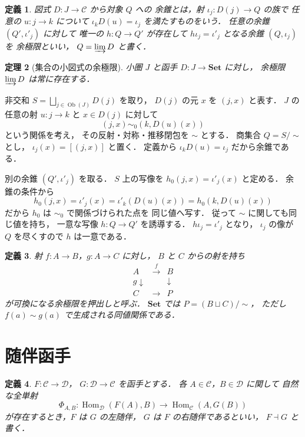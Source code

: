 \documentclass[a5paper,10pt,onecolumn]{jsarticle}
\makeatletter
\theoremstyle{mathnotetheorem}
\newtheorem{theorem}{定理}[section]
\newtheorem{definition}[theorem]{定義}
\renewcommand{\proofname}{証明}
\renewenvironment{proof}[1][\proofname]{%
  \par\pushQED{\qed}\normalfont\topsep4\p@\@plus2\p@\relax
  \trivlist\item[\hskip\labelsep\bfseries #1]\ignorespaces
}{\popQED\endtrivlist\@endpefalse}
\makeatother
\begin{document}
\begin{definition}
図式 $D:J\to\mathcal C$ から対象 $Q$ への
\emph{余錐}とは，射 $\iota_j:D(j)\to Q$ の族で
任意の $u:j\to k$ について
$\iota_kD(u)=\iota_j$ を満たすものをいう．
任意の余錐 $(Q',\iota'_j)$ に対して
唯一の $h:Q\to Q'$ が存在して
$h\iota_j=\iota'_j$ となる余錐 $(Q,\iota_j)$ を
\emph{余極限}といい，
$Q=\varinjlim D$ と書く．
\end{definition}

\begin{theorem}[集合の小図式の余極限]\label{thm:set-colimits}
小圏 $J$ と函手 $D:J\to\mathbf{Set}$ に対し，
余極限 $\varinjlim D$ は常に存在する．
\end{theorem}
\begin{proof}
非交和
$S=\bigsqcup_{j\in\operatorname{Ob}(J)}D(j)$ を取り，
$D(j)$ の元 $x$ を $(j,x)$ と表す．
$J$ の任意の射 $u:j\to k$ と $x\in D(j)$ に対して
\[
 (j,x)\sim_0(k,D(u)(x))
\]
という関係を考え，
その反射・対称・推移閉包を $\sim$ とする．
商集合 $Q=S/{\sim}$ とし，
$\iota_j(x)=[(j,x)]$ と置く．
定義から $\iota_kD(u)=\iota_j$ だから余錐である．

別の余錐 $(Q',\iota'_j)$ を取る．
$S$ 上の写像を $h_0(j,x)=\iota'_j(x)$ と定める．
余錐の条件から
\[
 h_0(j,x)=\iota'_j(x)
 =\iota'_k(D(u)(x))
 =h_0(k,D(u)(x))
\]
だから $h_0$ は $\sim_0$ で関係づけられた点を
同じ値へ写す．
従って $\sim$ に関しても同じ値を持ち，
一意な写像 $h:Q\to Q'$ を誘導する．
$h\iota_j=\iota'_j$ となり，
$\iota_j$ の像が $Q$ を尽くすので $h$ は一意である．
\end{proof}

\begin{definition}
射 $f:A\to B$，$g:A\to C$ に対し，
$B$ と $C$ からの射を持ち
\[
 \begin{array}{ccc}
 A&\xrightarrow{f}&B\\
 {\scriptstyle g}\downarrow&&\downarrow\\
 C&\longrightarrow&P
 \end{array}
\]
が可換になる余極限を\emph{押出し}と呼ぶ．
$\mathbf{Set}$ では
$P=(B\sqcup C)/{\sim}$，
ただし $f(a)\sim g(a)$ で生成される同値関係である．
\end{definition}

\section{随伴函手}

\begin{definition}
$F:\mathcal C\to\mathcal D$，
$G:\mathcal D\to\mathcal C$ を函手とする．
各 $A\in\mathcal C$，$B\in\mathcal D$ に関して
自然な全単射
\[
 \Phi_{A,B}:
 \operatorname{Hom}_{\mathcal D}(F(A),B)
 \longrightarrow
 \operatorname{Hom}_{\mathcal C}(A,G(B))
\]
が存在するとき，$F$ は $G$ の\emph{左随伴}，
$G$ は $F$ の\emph{右随伴}であるといい，
$F\dashv G$ と書く．
\end{definition}
\end{document}
